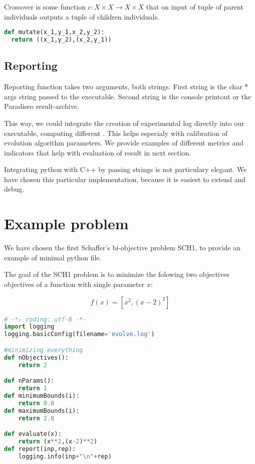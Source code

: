 \documentclass[12pt,oneside]{fithesis2}
\begin{document}
Crossover is some function $c:X \times X \to X \times X$ that on input of tuple of parent individuals outputs a tuple of children individuals.
\begin{lstlisting}[language=Python,label=cross_example,caption=Crossover example]
def mutate(x_1,y_1,x_2,y_2):
  return ((x_1,y_2),(x_2,y_1))
\end{lstlisting}


\subsection{Reporting}

Reporting function takes two arguments, both strings. First string is the char * args string passed to the executable. Second string is the console printout or the Paradiseo result-archive.

This way, we could integrate the creation of experimental log directly into our executable, computing different . This helps especialy with calibration of evolution algorithm parameters.
We provide examples of different metrics and indicators that help with evaluation of result in next section.

Integrating python with C++ by passing strings is not particulary elegant. We have chosen this particular implementation, because it is easiest to extend and debug.

\section{Example problem}

We have chosen the first Schaffer's bi-objective problem SCH1, to provide an example of minimal python file.

The goal of the SCH1 problem is to minimize the folowing two objectives objectives of a function with single parameter $x$:

$$f(x) = [x^2,(x-2)^2]$$

\begin{lstlisting}[language=Python,label=min_example,caption=Minimal working example]
# -*- coding: utf-8 -*-
import logging
logging.basicConfig(filename='evolve.log')

#minimizing everything 
def nObjectives():
	return 2

def nParams():
	return 1
def minimumBounds(i):
	return 0.0
def maximumBounds(i):
	return 2.0

def evaluate(x):
	return (x**2,(x-2)**2)
def report(inp,rep):
	logging.info(inp+"\n"+rep) 
\end{lstlisting}
\end{document}
